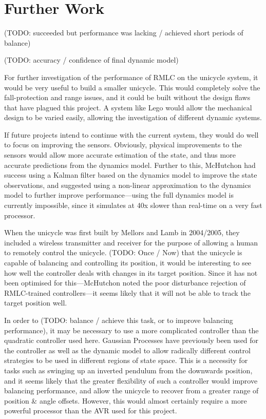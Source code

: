 \documentclass{IIBproject}
\begin{document}
\section{Further Work}

(TODO: succeeded but performance was lacking / achieved short periods of balance)

(TODO: accuracy / confidence of final dynamic model)

For further investigation of the performance of RMLC on the unicycle system,
it would be very useful to build a smaller unicycle. This would completely
solve the fall-protection and range issues, and it could be built without the
design flaws that have plagued this project. A system like Lego would allow
the mechanical design to be varied easily, allowing the investigation of
different dynamic systems.

If future projects intend to continue with the current system, they would do
well to focus on improving the sensors. Obviously, physical improvements to
the sensors would allow more accurate estimation of the state, and thus more
accurate predictions from the dynamics model. Further to this, McHutchon had
success using a Kalman filter based on the dynamics model to improve the state
observations, and suggested using a non-linear approximation to the dynamics
model to further improve performance---using the full dynamics model is
currently impossible, since it simulates at 40x slower than real-time on a
very fast processor.

When the unicycle was first built by Mellors and Lamb in 2004/2005, they
included a wireless transmitter and receiver for the purpose of allowing a
human to remotely control the unicycle. 
(TODO: Once / Now) that the unicycle is capable of balancing and controlling its
position, it would be interesting to see how well the controller deals with
changes in its target position. Since it has not been optimised for
this---McHutchon noted the poor disturbance rejection of RMLC-trained
controllers---it seems likely that it will not be able to track the target
position well.

In order to (TODO: balance / achieve this task, or to improve balancing
performance), it may be necessary to use a more complicated controller than the
quadratic controller used here. Gaussian Processes have previously been used
for the controller as well as the dynamic model to allow radically different
control strategies to be used in different regions of state space. This is a
necessity for tasks such as swinging up an inverted pendulum from the
downwards position, and it seems likely that the greater flexibility of such a
controller would improve balancing performance, and allow the unicycle to
recover from a greater range of position \& angle offsets. However, this would
almost certainly require a more powerful processor than the AVR used for this
project.
\end{document}
